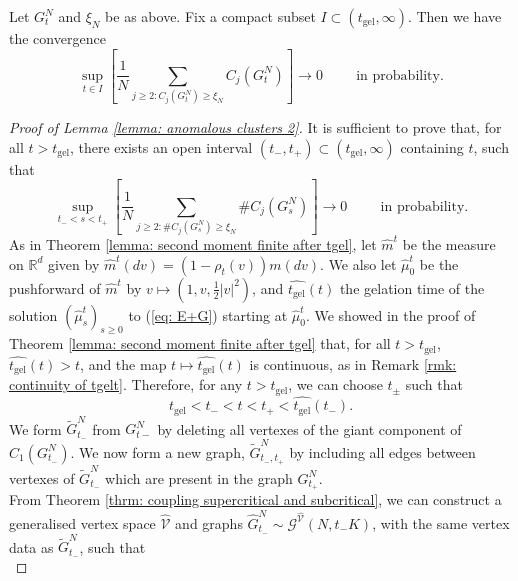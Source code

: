 \begin{lemma}\label{lemma: anomalous clusters 2}
       Let $G^N_t$ and $\xi_N$ be as above. Fix a compact subset $I\subset (t_\text{gel}, \infty)$. Then we have the convergence \begin{equation} \sup_{t \in I}\left[\frac{1}{N}\sum_{j\geq 2: C_j(G^N_t)\geq \xi_N} C_j(G^N_t)\right] \rightarrow 0 \hspace{1cm}\text{in probability.}\end{equation}
\end{lemma}
\begin{proof}[Proof of Lemma \ref{lemma: anomalous clusters 2}]  It is sufficient to prove that, for all $t>t_\text{gel}$, there exists an open interval $(t_-, t_+) \subset (t_\text{gel}, \infty)$ containing $t$, such that
\begin{equation}
    \sup_{t_-<s<t_+}\left[\frac{1}{N}\sum_{j\geq 2: \#C_j(G^N_s)\geq \xi_N} \#C_j(G^N_s)\right] \rightarrow 0 \hspace{1cm}\text{in probability.}
\end{equation} As in Theorem \ref{lemma: second moment finite after tgel}, let $\widehat{m}^t$ be the measure on $\mathbb{R}^d$ given by $\widehat{m}^t(dv)=(1-\rho_t(v))m(dv)$. We also let $\widehat{\mu}^t_0$ be the pushforward of $\widehat{m}^t$ by $v\mapsto (1,v,\frac{1}{2}|v|^2)$, and $\widehat{t_\text{gel}}(t)$ the gelation time of the solution $(\widehat{\mu}^t_s)_{s\ge 0}$ to (\ref{eq: E+G}) starting at $\widehat{\mu}^t_0$. We showed in the proof of Theorem \ref{lemma: second moment finite after tgel} that, for all $t>t_\text{gel}$,  $\widehat{t_\text{gel}}(t)>t$, and the map $t\mapsto \widehat{t_\text{gel}}(t)$ is continuous, as in Remark \ref{rmk: continuity of tgelt}. Therefore, for any $t>t_\text{gel}$, we can choose $t_\pm$ such that
\begin{equation}
    t_\text{gel}<t_-<t<t_+<\widehat{t_\text{gel}}(t_-).
\end{equation} We form $\widetilde{G}^N_{t_-}$ from $G^N_{t-}$ by deleting all vertexes of the giant component of $C_1(G^N_{t_-})$. We now form a new graph, $\widetilde{G}^N_{t_-,t_+}$ by including all edges between vertexes of $\widetilde{G}^N_{t_-}$ which are present in the graph $G^N_{t_+}$. \medskip \\ From Theorem \ref{thrm: coupling supercritical and subcritical}, we can construct a generalised vertex space $\widehat{\mathcal{V}}$ and graphs $\widehat{G}^N_{t_-}\sim \mathcal{G}^{\widehat{\mathcal{V}}}(N,t_-K)$, with the same vertex data as $\widetilde{G}^N_{t_-}$, such that \begin{equation}

\end{equation}
\end{proof}
